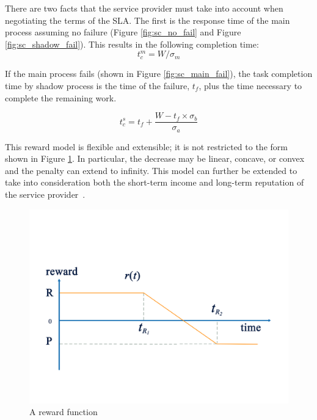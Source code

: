 %

There are two facts that the service provider must take into account
when negotiating the terms of the SLA. The first is the response time
of the main process assuming no failure (Figure
\ref{fig:sc_no_fail} and Figure \ref{fig:sc_shadow_fail}). This
results in the following completion time:
\begin{equation}
t_c^m=W/\sigma_m
\label{eq:tcm}
\end{equation}

If the main process fails (shown in Figure \ref{fig:sc_main_fail}), the
task completion time by shadow process is the time of the failure,
$t_f$, plus the time necessary to complete the remaining work.

\begin{equation}
t_c^s=t_f+\frac{W-t_f \times \sigma_b}{\sigma_a}
\label{eq:tcs}
\end{equation}

This reward model is flexible and extensible; it is not restricted to
the form shown in Figure \ref{fig:reward}. In particular, the decrease
may be linear, concave, or convex and the penalty can extend to
infinity. This model can further be extended to take into
consideration both the short-term income and long-term reputation of
the service provider~\cite{Daw:2002:LRP:639717.639720}.


\begin{figure}[t!]	
	\begin{center}
		\includegraphics[width=0.6\columnwidth]{figures/reward.pdf}
	\end{center}
	\caption{A reward function}
	\label{fig:reward}
\end{figure}


